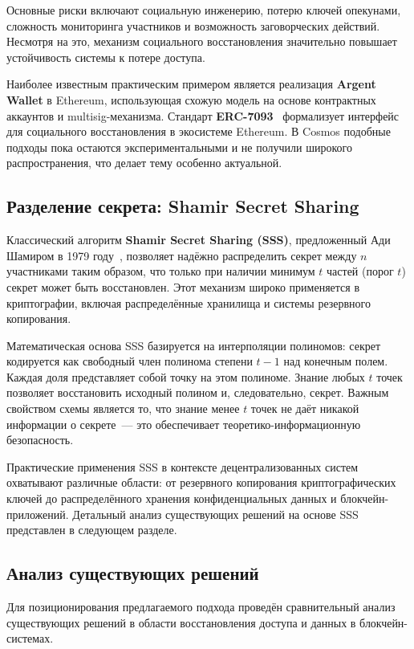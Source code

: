 Основные риски включают социальную инженерию, потерю ключей опекунами, сложность мониторинга участников и возможность заговорческих действий. Несмотря на это, механизм социального восстановления значительно повышает устойчивость системы к потере доступа.

Наиболее известным практическим примером является реализация \textbf{Argent Wallet} в Ethereum, использующая схожую модель на основе контрактных аккаунтов и multisig-механизма. Стандарт \textbf{ERC-7093}~\cite{s7} формализует интерфейс для социального восстановления в экосистеме Ethereum. В Cosmos подобные подходы пока остаются экспериментальными и не получили широкого распространения, что делает тему особенно актуальной.

\subsection{Разделение секрета: Shamir Secret Sharing}

Классический алгоритм \textbf{Shamir Secret Sharing (SSS)}, предложенный Ади Шамиром в 1979 году~\cite{s10}, позволяет надёжно распределить секрет между $n$ участниками таким образом, что только при наличии минимум $t$ частей (порог $t$) секрет может быть восстановлен. Этот механизм широко применяется в криптографии, включая распределённые хранилища и системы резервного копирования.

Математическая основа SSS базируется на интерполяции полиномов: секрет кодируется как свободный член полинома степени $t-1$ над конечным полем. Каждая доля представляет собой точку на этом полиноме. Знание любых $t$ точек позволяет восстановить исходный полином и, следовательно, секрет. Важным свойством схемы является то, что знание менее $t$ точек не даёт никакой информации о секрете~--- это обеспечивает теоретико-информационную безопасность.

Практические применения SSS в контексте децентрализованных систем охватывают различные области: от резервного копирования криптографических ключей до распределённого хранения конфиденциальных данных и блокчейн-приложений. Детальный анализ существующих решений на основе SSS представлен в следующем разделе.

\subsection{Анализ существующих решений}

Для позиционирования предлагаемого подхода проведён сравнительный анализ существующих решений в области восстановления доступа и данных в блокчейн-системах.

